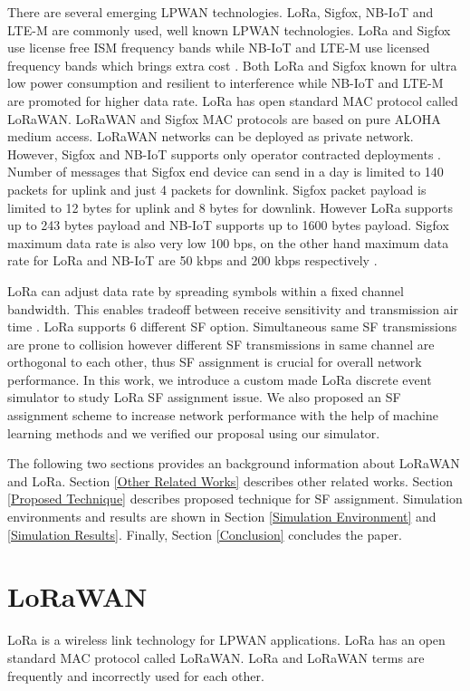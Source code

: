 \documentclass[conference]{IEEEtran}
\begin{document}
\par There are several emerging LPWAN technologies. LoRa, Sigfox, NB-IoT and LTE-M are commonly used, well known LPWAN technologies. LoRa and Sigfox use license free ISM frequency bands while NB-IoT and LTE-M use licensed frequency bands which brings extra cost \cite{7815384}. Both LoRa and Sigfox known for ultra low power consumption and resilient to interference while NB-IoT and LTE-M are promoted for higher data rate. LoRa has open standard MAC protocol called LoRaWAN. LoRaWAN and Sigfox MAC protocols are based on pure ALOHA medium access.  LoRaWAN networks can be deployed as private network. However, Sigfox and NB-IoT supports only operator contracted deployments \cite{7815384}. Number of messages that Sigfox end device can send in a day is limited to 140 packets for uplink and just 4 packets for downlink. Sigfox packet payload is limited to 12 bytes for uplink and 8 bytes for downlink. However LoRa supports up to 243 bytes payload and NB-IoT supports up to 1600 bytes payload. Sigfox maximum data rate is also very low 100 bps, on the other hand maximum data rate for LoRa and NB-IoT are 50 kbps and 200 kbps respectively \cite{7815384}.

\par LoRa can adjust data rate by spreading symbols within a fixed channel bandwidth. This enables tradeoff between receive sensitivity and transmission air time \cite{7803607}. LoRa supports 6 different SF option. Simultaneous same SF transmissions are prone to collision however different SF transmissions in same channel are orthogonal to each other, thus SF assignment is crucial for overall network performance. In this work, we introduce a custom made LoRa discrete event simulator to study LoRa SF assignment issue. We also proposed an SF assignment scheme to increase network performance with the help of machine learning methods and we verified our proposal using our simulator.

\par The following two sections provides an background information about LoRaWAN and LoRa. Section \ref{Other Related Works} describes other related works. Section \ref{Proposed Technique} describes proposed technique for SF assignment. Simulation environments and results are shown in Section \ref{Simulation Environment} and \ref{Simulation Results}. Finally, Section \ref{Conclusion} concludes the paper.


\section{LoRaWAN} \label{LoRaWAN}
\par LoRa is a wireless link technology for LPWAN applications. LoRa has an open standard MAC protocol called LoRaWAN. LoRa and LoRaWAN terms are frequently and incorrectly used for each other.
\end{document}
